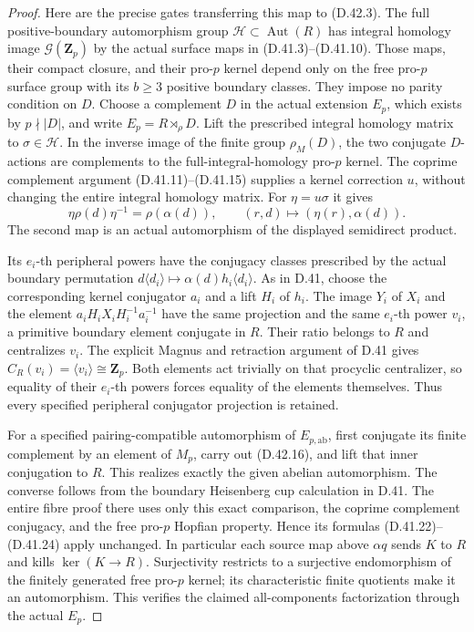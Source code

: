 \begin{proof}
Here are the precise gates transferring this
map to \textup{(D.42.3)}.
The full positive-boundary automorphism
group \(\mathcal H\subset\operatorname{Aut}(R)\)
has integral homology image
\(\mathcal G(\mathbf Z_p)\) by the actual
surface maps in \textup{(D.41.3)--(D.41.10)}.
Those maps, their compact closure, and their
pro-\(p\) kernel depend only on the free
pro-\(p\) surface group with its \(b\geq3\)
positive boundary classes.
They impose no parity condition on \(D\).
Choose a complement \(D\) in the actual
extension \(E_p\), which exists by
\(p\nmid|D|\), and write
\(E_p=R\rtimes_\rho D\).
Lift the prescribed integral homology matrix
to \(\sigma\in\mathcal H\).
In the inverse image of the finite group
\(\rho_M(D)\), the two conjugate \(D\)-actions
are complements to the full-integral-homology
pro-\(p\) kernel.
The coprime complement argument
\textup{(D.41.11)--(D.41.15)} supplies a
kernel correction \(u\), without changing
the entire integral homology matrix.
For \(\eta=u\sigma\) it gives
\[
       \eta\rho(d)\eta^{-1}=\rho(\alpha(d)),
       \qquad
       (r,d)\longmapsto(\eta(r),\alpha(d)).
 \tag{D.42.16}
\]
The second map is an actual automorphism
of the displayed semidirect product.

Its \(e_i\)-th peripheral powers have
the conjugacy classes prescribed by the
actual boundary permutation
\(d\langle d_i\rangle\mapsto
\alpha(d)h_i\langle d_i\rangle\).
As in D.41, choose the corresponding
kernel conjugator \(a_i\) and a lift
\(H_i\) of \(h_i\).
The image \(Y_i\) of \(X_i\) and the
element \(a_iH_iX_iH_i^{-1}a_i^{-1}\)
have the same projection and the same
\(e_i\)-th power \(v_i\), a primitive
boundary element conjugate in \(R\).
Their ratio belongs to \(R\) and
centralizes \(v_i\).
The explicit Magnus and retraction
argument of D.41 gives
\(C_R(v_i)=\langle v_i\rangle\cong\mathbf Z_p\).
Both elements act trivially on that
procyclic centralizer, so equality of
their \(e_i\)-th powers forces equality
of the elements themselves.
Thus every specified peripheral
conjugator projection is retained.

For a specified pairing-compatible
automorphism of \(E_{p,\mathrm{ab}}\),
first conjugate its finite complement
by an element of \(M_p\), carry out
\textup{(D.42.16)}, and lift that inner
conjugation to \(R\).
This realizes exactly the given
abelian automorphism.
The converse follows from the boundary
Heisenberg cup calculation in D.41.
The entire fibre proof there uses
only this exact comparison, the
coprime complement conjugacy, and
the free pro-\(p\) Hopfian property.
Hence its formulas
\textup{(D.41.22)--(D.41.24)} apply
unchanged.
In particular each source map above
\(\alpha q\) sends \(K\) to \(R\)
and kills \(\ker(K\to R)\).
Surjectivity restricts to a surjective
endomorphism of the finitely generated
free pro-\(p\) kernel; its characteristic
finite quotients make it an automorphism.
This verifies the claimed all-components
factorization through the actual \(E_p\).


\end{proof}
